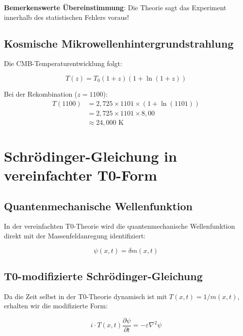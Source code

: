 \documentclass[12pt,a4paper]{article}
\newcommand{\deltam}{\delta m}
\theoremstyle{definition}
\theoremstyle{remark}
\begin{document}
	\textbf{Bemerkenswerte Übereinstimmung}: Die Theorie sagt das Experiment innerhalb des statistischen Fehlers voraus!
	
	\subsection{Kosmische Mikrowellenhintergrundstrahlung}
	
	Die CMB-Temperaturentwicklung folgt:
	
	\begin{equation}
		T(z) = T_0(1+z)\left(1 + \ln(1+z)\right)
		\label{eq:cmb_temperature}
	\end{equation}
	
	Bei der Rekombination ($z = 1100$):
	\begin{align}
		T(1100) &= 2{,}725 \times 1101 \times (1 + \ln(1101)) \\
		&= 2{,}725 \times 1101 \times 8{,}00 \\
		&\approx 24{,}000 \text{ K}
	\end{align}
	
	\section{Schrödinger-Gleichung in vereinfachter T0-Form}
	
	\subsection{Quantenmechanische Wellenfunktion}
	
	In der vereinfachten T0-Theorie wird die quantenmechanische Wellenfunktion direkt mit der Massenfeldanregung identifiziert:
	
	\begin{equation}
		\boxed{\psi(x,t) = \deltam(x,t)}
		\label{eq:wavefunction_identification}
	\end{equation}
	
	\subsection{T0-modifizierte Schrödinger-Gleichung}
	
	Da die Zeit selbst in der T0-Theorie dynamisch ist mit $T(x,t) = 1/m(x,t)$, erhalten wir die modifizierte Form:
	
	\begin{equation}
		\boxed{i \cdot T(x,t) \frac{\partial\psi}{\partial t} = -\varepsilon \nabla^2 \psi}
		\label{eq:t0_modified_schrodinger}
	\end{equation}
	
\end{document}
